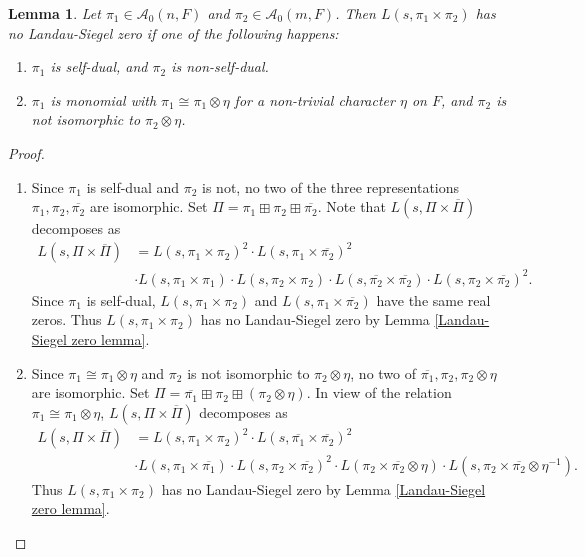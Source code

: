 \documentclass[12pt]{amsart}
\newcommand{\cA}{\mathcal{A}}
\newcommand{\ov}{\overline}
\newtheorem{lemma}{Lemma}[section]
\begin{document}
\begin{lemma}\label{new Rankin-Selberg Landau-Siegel zero}
    Let $\pi_1 \in \cA_0(n,F)$ and $\pi_2 \in \cA_0(m,F)$. Then $L(s,\pi_1 \times \pi_2)$ has no Landau-Siegel zero if one of the following happens:
    \begin{enumerate}
        \item $\pi_1$ is self-dual, and $\pi_2$ is non-self-dual. 
        \item $\pi_1$ is monomial with $\pi_1 \cong \pi_1 \otimes \eta$ for a non-trivial character $\eta$ on $F$, and $\pi_2$ is not isomorphic to $\pi_2 \otimes \eta$.
    \end{enumerate}
\end{lemma}

\begin{proof}
    \begin{enumerate}
        \item Since $\pi_1$ is self-dual and $\pi_2$ is not, no two of the three representations $\pi_1,\pi_2, \ov{\pi_2}$ are isomorphic. Set $\Pi = \pi_1 \boxplus \pi_2 \boxplus \ov{\pi_2}$. Note that $L(s,\Pi \times \ov{\Pi})$ decomposes as 
        \begin{align*}
            L(s,\Pi \times \ov{\Pi}) &= L(s,\pi_1 \times \pi_2)^2 \cdot L(s,\pi_1 \times \ov{\pi_2})^2 \\
            &\cdot L(s,\pi_1 \times \pi_1) \cdot L(s,\pi_2 \times \pi_2) \cdot L(s,\ov{\pi_2} \times \ov{\pi_2}) \cdot L(s,\pi_2 \times \ov{\pi_2})^2.
        \end{align*}
        Since $\pi_1$ is self-dual, $L(s,\pi_1 \times \pi_2)$ and $L(s,\pi_1 \times \ov{\pi_2})$ have the same real zeros. Thus $L(s,\pi_1 \times \pi_2)$ has no Landau-Siegel zero by Lemma \ref{Landau-Siegel zero lemma}.
        \item Since $\pi_1 \cong \pi_1 \otimes \eta$ and $\pi_2$ is not isomorphic to $\pi_2 \otimes \eta$, no two of $\ov{\pi_1},\pi_2,\pi_2 \otimes \eta$ are isomorphic. Set $\Pi = \ov{\pi_1} \boxplus \pi_2 \boxplus (\pi_2 \otimes \eta)$. In view of the relation $\pi_1 \cong \pi_1 \otimes \eta$, $L(s,\Pi \times \ov{\Pi})$ decomposes as 
        \begin{align*}
            L(s,\Pi \times \ov{\Pi}) &= L(s,\pi_1 \times \pi_2)^2 \cdot L(s,\ov{\pi_1} \times \ov{\pi_2})^2 \\
            &\cdot L(s,\pi_1 \times \ov{\pi_1}) \cdot L(s,\pi_2 \times \ov{\pi_2})^2 \cdot L(\pi_2 \times \ov{\pi_2} \otimes \eta) \cdot L(s,\pi_2 \times \ov{\pi_2} \otimes \eta^{-1}).
        \end{align*}
        Thus $L(s,\pi_1 \times \pi_2)$ has no Landau-Siegel zero by Lemma \ref{Landau-Siegel zero lemma}.
    \end{enumerate}
\end{proof}
\end{document}
